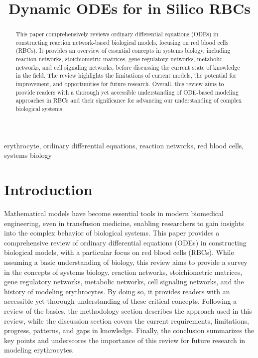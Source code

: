 \documentclass[conference]{IEEEtran}
\begin{document}
\title{Dynamic ODEs for in Silico RBCs
}
\author{
}

\maketitle

\begin{abstract}
This paper comprehensively reviews ordinary differential equations (ODEs) in constructing reaction network-based biological models, focusing on red blood cells (RBCs). It provides an overview of essential concepts in systems biology, including reaction networks, stoichiometric matrices, gene regulatory networks, metabolic networks, and cell signaling networks, before discussing the current state of knowledge in the field. The review highlights the limitations of current models, the potential for improvement, and opportunities for future research. Overall, this review aims to provide readers with a thorough yet accessible understanding of ODE-based modeling approaches in RBCs and their significance for advancing our understanding of complex biological systems.
\end{abstract}

\begin{IEEEkeywords}
erythrocyte, ordinary differential equations, reaction networks, red blood cells, systems biology
\end{IEEEkeywords}

\section{Introduction}
Mathematical models have become essential tools in modern biomedical engineering, even in transfusion medicine, enabling researchers to gain insights into the complex behavior of biological systems\cite{b1, b2}. This paper provides a comprehensive review of ordinary differential equations (ODEs) in constructing biological models, with a particular focus on red blood cells (RBCs). While assuming a basic understanding of biology, this review aims to provide a survey in the concepts of systems biology, reaction networks, stoichiometric matrices, gene regulatory networks, metabolic networks, cell signaling networks, and the history of modeling erythrocytes. By doing so, it provides readers with an accessible yet thorough understanding of these critical concepts. Following a review of the basics, the methodology section describes the approach used in this review, while the discussion section covers the current requirements, limitations, progress, patterns, and gaps in knowledge. Finally, the conclusion summarizes the key points and underscores the importance of this review for future research in modeling erythrocytes.
\end{document}
